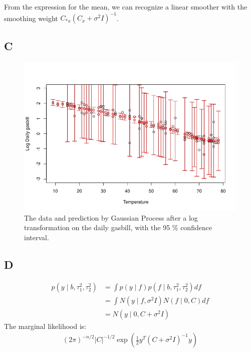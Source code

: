 \documentclass{article}
\begin{document}
From the expression for the mean, we can recognize a linear smoother with the smoothing weight \( C_{*x} (C_x + \sigma^2 I)^{-1} \).

\subsection*{C}
\begin{figure}
\includegraphics[width=\textwidth]{util_gp_ci.jpeg}
\caption{The data and prediction by Gaussian Process after a log transformation on the daily gasbill, with the 95 \% confidence interval.}
\label{fig:util_log}
\end{figure}


\subsection*{D}
\begin{align*}
p(y \mid b, \tau_1^2, \tau_2^2) &= \int p(y \mid f) p( f \mid b, \tau_1^2, \tau_2^2) df\\
&= \int N(y \mid f, \sigma^2 I) N(f \mid 0, C) df \\
&= N(y \mid 0, C + \sigma^2 I)
\end{align*}
The marginal likelihood is:
\begin{align*}
(2\pi)^{-n/2} |C|^{-1/2} \exp \left( \frac{1}{2} y^T (C + \sigma^2 I)^{-1} y \right)
\end{align*}
\end{document}
